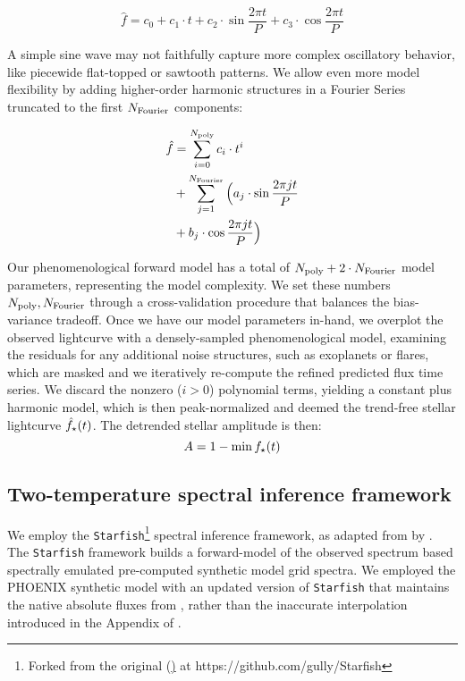 \documentclass[twocolumn]{emulateapj}%
\begin{document}
\begin{equation}
\hat f = c_0 + c_1 \cdot t + c_2 \cdot \sin{\frac{2\pi t}{P}} + c_3 \cdot \cos{\frac{2\pi t}{P}}
\end{equation}

A simple sine wave may not faithfully capture more complex oscillatory behavior, like piecewide flat-topped or sawtooth patterns.  We allow even more model flexibility by adding higher-order harmonic structures in a Fourier Series \citep{vanderplas15a} truncated to the first $N_{\rm Fourier}$ components:

\begin{equation}
  \begin{split}
 \hat f  & =  \sum_{i=0}^{N_{\rm poly}} c_i \cdot t^i \\
         & + \sum_{j=1}^{N_{\rm Fourier}} \Big( a_j \cdot \sin{\frac{2\pi j t}{P}} \\
         & + b_j \cdot \cos{\frac{2\pi j t}{P}} \Big)
\end{split}
\end{equation}

Our phenomenological forward model has a total of $N_{\rm poly}+2 \cdot N_{\rm Fourier}$ model parameters, representing the model complexity.  We set these numbers $N_{\rm poly}, N_{\rm Fourier}$ through a cross-validation procedure that balances the bias-variance tradeoff.  Once we have our model parameters in-hand, we overplot the observed lightcurve with a densely-sampled phenomenological model, examining the residuals for any additional noise structures, such as exoplanets or flares, which are masked and we iteratively re-compute the refined predicted flux time series.  We discard the nonzero ($i>0$) polynomial terms, yielding a constant plus harmonic model, which is then peak-normalized and deemed the trend-free stellar lightcurve $\hat f_{\rm \star}(t)$.  The detrended stellar amplitude is then: $$ A = 1 - \min{f_{\rm \star}(t)}$$

\subsection{Two-temperature spectral inference framework}

We employ the \texttt{Starfish}\footnote{Forked from the original (\href{https://github.com/iancze/Starfish}) at https://github.com/gully/Starfish} \citep{czekala15} spectral inference framework, as adapted from  by \citet{2017ApJ...836..200G}.  The \texttt{Starfish} framework builds a forward-model of the observed spectrum based spectrally emulated pre-computed synthetic model grid spectra.  We employed the PHOENIX synthetic model with an updated version of \texttt{Starfish} that maintains the native absolute fluxes from \citet{husser13}, rather than the inaccurate interpolation introduced in the Appendix of \citet{2017ApJ...836..200G}.
\end{document}
